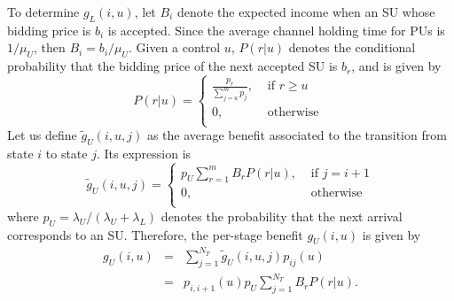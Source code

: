 To determine $g_{L}(i,u)$, let $B_{i}$ denote the expected income when an SU whose bidding price is $b_{i}$ is accepted. Since the average channel holding time for PUs is $1/\mu_{U}$, then $B_{i} = b_{i}/\mu_{U}$.
Given a control $u$, $P\left(r | u\right)$ denotes the conditional probability that the bidding price of the next accepted SU is $b_{r}$, and is given by
\begin{equation}
	  P\left(r |u\right) =
	  \begin{cases}
		\displaystyle\frac{p_{r}}{\sum^{m}_{j = u}p_{j}}, & \text{ if }r \geq u\\	
		0, & \text{ otherwise } \\
 \end{cases}
\end{equation}
Let us define $\tilde{g}_{U}(i,u,j)$ as the average benefit associated to the transition from state $i$ to state $j$. Its expression is
\begin{equation}
	  \tilde{g}_{U}(i,u,j) =
	  \begin{cases}
		p_{U}\sum^{m}_{r = 1}B_{r}P\left(r | u\right), & \text{ if }j = i+1\\	
		0, & \text{ otherwise} \\
 \end{cases}
\end{equation}
where $p_{U} = \lambda_{U}/(\lambda_{U}+\lambda_{L})$ denotes the probability that the next arrival corresponds to an SU.
Therefore, the per-stage benefit $g_{U}(i,u)$ is given by
\begin{equation}\label{gUauction}
\begin{array}{lcl}
g_{U}(i,u) & = & \sum^{N_{T}}_{j = 1}\tilde{g}_{U}(i,u,j)p_{ij}(u)\\
					& = & p_{i,i+1}(u)p_{U}\sum^{N_{T}}_{j = 1}B_{r}P\left(r |u\right).
	\end{array}
\end{equation}

